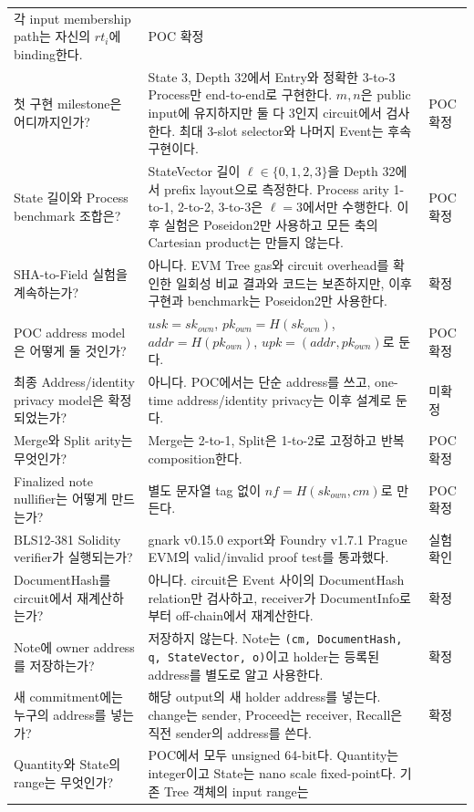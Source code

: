 \documentclass[11pt]{extarticle}
\begin{document}
{\begin{longtable}[]{@{}L{0.24\textwidth}L{0.56\textwidth}L{0.12\textwidth}@{}}
각 input membership path는 자신의 $rt_i$에 binding한다. & POC 확정 \\
첫 구현 milestone은 어디까지인가? & State 3, Depth 32에서 Entry와 정확한
3-to-3 Process만 end-to-end로 구현한다. $m,n$은 public input에 유지하지만 둘 다
3인지 circuit에서 검사한다. 최대 3-slot selector와 나머지 Event는 후속 구현이다.
& POC 확정 \\
State 길이와 Process benchmark 조합은? & StateVector 길이
$\ell\in\{0,1,2,3\}$을 Depth 32에서 prefix layout으로 측정한다. Process arity
1-to-1, 2-to-2, 3-to-3은 $\ell=3$에서만 수행한다. 이후 실험은 Poseidon2만 사용하고
모든 축의 Cartesian product는 만들지 않는다. & POC 확정 \\
SHA-to-Field 실험을 계속하는가? & 아니다. EVM Tree gas와 circuit overhead를 확인한
일회성 비교 결과와 코드는 보존하지만, 이후 구현과 benchmark는 Poseidon2만 사용한다.
& 확정 \\
POC address model은 어떻게 둘 것인가? &
$usk=sk_{own}$, $pk_{own}=H(sk_{own})$, $addr=H(pk_{own})$,
$upk=(addr,pk_{own})$로 둔다. & POC 확정 \\
최종 Address/identity privacy model은 확정되었는가? & 아니다. POC에서는
단순 address를 쓰고, one-time address/identity privacy는 이후 설계로
둔다. & 미확정 \\
Merge와 Split arity는 무엇인가? & Merge는 2-to-1, Split은 1-to-2로
고정하고 반복 composition한다. & POC 확정 \\
Finalized note nullifier는 어떻게 만드는가? & 별도 문자열 tag 없이
$nf=H(sk_{own},cm)$로 만든다. & POC 확정 \\
BLS12-381 Solidity verifier가 실행되는가? & gnark v0.15.0 export와 Foundry
v1.7.1 Prague EVM의 valid/invalid proof test를 통과했다. & 실험 확인 \\
DocumentHash를 circuit에서 재계산하는가? & 아니다. circuit은 Event 사이의
DocumentHash relation만 검사하고, receiver가 DocumentInfo로부터 off-chain에서
재계산한다. & 확정 \\
Note에 owner address를 저장하는가? & 저장하지 않는다. Note는
\texttt{(cm, DocumentHash, q, StateVector, o)}이고 holder는 등록된 address를
별도로 알고 사용한다. & 확정 \\
새 commitment에는 누구의 address를 넣는가? & 해당 output의 새 holder address를
넣는다. change는 sender, Proceed는 receiver, Recall은 직전 sender의 address를 쓴다.
& 확정 \\
Quantity와 State의 range는 무엇인가? & POC에서 모두 unsigned 64-bit다.
Quantity는 integer이고 State는 nano scale fixed-point다. 기존 Tree 객체의 input range는

\end{longtable}}
\end{document}
